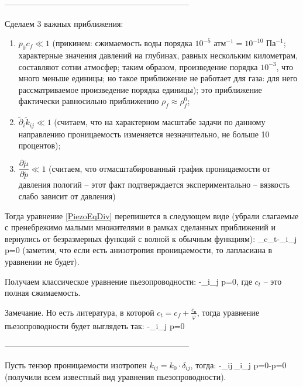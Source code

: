 \documentclass[main.tex]{subfiles}
\begin{document}
--------------------------------------------------------------------

Сделаем 3 важных приближения:
\begin{enumerate}
	\item $p_0 c_f\ll 1$ (прикинем: сжимаемость воды порядка $10^{-5}\text{ атм}^{-1}=10^{-10}\text{ Па}^{-1}$; характерные значения давлений на глубинах, равных нескольким километрам, составляют сотни атмосфер; таким образом, произведение порядка $10^{-3}$, что много меньше единицы; но такое приближение не работает для газа: для него рассматриваемое произведение порядка единицы); это приближение фактически равносильно приближению $\rho_f\approx\rho_f^0$;
	\item $\tilde{\partial}_i\tilde{k}_{ij}\ll 1$ (считаем, что на характерном масштабе задачи по данному направлению проницаемость изменяется незначительно, не больше 10 процентов);
	\item $\dfrac{\partial\tilde{\mu}}{\partial\tilde{p}}\ll 1$ (считаем, что отмасштабированный график проницаемости от давления пологий -- этот факт подтверждается экспериментально -- вязкость слабо зависит от давления)
\end{enumerate}

Тогда уравнение \eqref{PiezoEqDiv} перепишется в следующем виде (убрали слагаемые с пренебрежимо малыми множителями в рамках сделанных приближений и вернулись от безразмерных функций с волной к обычным функциям):
\beq
{}_{c_t}-\partial_i\partial_j p=0
\eeq
(заметим, что если есть анизотропия проницаемости, то лапласиана в уравнении не будет).

Получаем классическое уравнение пьезопроводности:
\beq
{}-\partial_i\partial_j p=0,
\eeq
где $c_t$ -- это полная сжимаемость.

Замечание. Но есть литература, в которой $c_t=c_f+\frac{c_\text{п}}{\varphi}$, тогда уравнение пьезопроводности будет выглядеть так:
\beq
{}-\partial_i\partial_j p=0
\eeq

--------------------------------------------------------------------

Пусть тензор проницаемости изотропен $k_{ij}=k_0\cdot\delta_{ij}$, тогда:
\beq
{}-\delta_{ij}\,\partial_i\partial_j p=0\Leftrightarrow{}-\Delta p=0
\eeq
(получили всем известный вид уравнения пьезопроводности).
\end{document}
